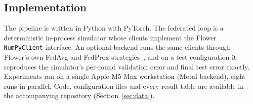 \subsection{Implementation}
The pipeline is written in Python with PyTorch. The federated loop is a deterministic in-process simulator whose
clients implement the Flower \texttt{NumPyClient} interface. An optional backend runs the same clients through
Flower's own FedAvg and FedProx strategies~\cite{beutel2020flower}, and on a test configuration it reproduces the
simulator's per-round validation error and final test error exactly. Experiments ran on a single Apple M5 Max
workstation (Metal backend), eight runs in parallel. Code, configuration files and every result table are available
in the accompanying repository (Section~\ref{sec:data}).
